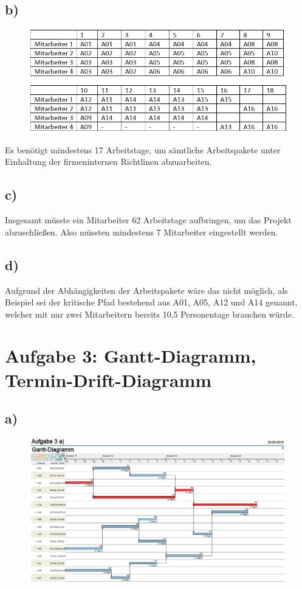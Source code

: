 \documentclass[12pt,pdftex,a4paper]{article}
\begin{document}
\newpage
\subsection*{b)}
\begin{figure}[htbp]
\centering
\includegraphics[width=1\textwidth]{2b.png}
\end{figure}

Es benötigt mindestens 17 Arbeitstage, um sämtliche Arbeitspakete unter Einhaltung der firmeninternen Richtlinen abzuarbeiten.

\subsection*{c)}

Insgesamt müsste ein Mitarbeiter 62 Arbeitstage aufbringen, um das Projekt abzuschließen. Also müssten mindestens 7 Mitarbeiter eingestellt werden.

\subsection*{d)}

Aufgrund der Abhängigkeiten der Arbeitspakete wäre das nicht möglich, als Beispiel sei der kritische Pfad bestehend aus A01, A05, A12 und A14 genannt, welcher mit nur zwei Mitarbeitern bereits 10,5 Personentage brauchen würde.

\newpage
\section*{Aufgabe 3: Gantt-Diagramm, Termin-Drift-Diagramm}

\subsection*{a)}
\begin{figure}[htbp]
\centering
\includegraphics[width=1\textwidth]{3a.png}
\end{figure}
\end{document}
